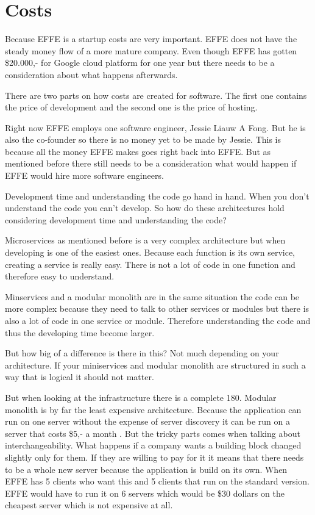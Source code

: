 \section{Costs}
\label{sec:Costs}

Because EFFE is a startup costs are very important. EFFE does not have the steady money flow of a more mature company. Even though EFFE has gotten \$20.000,- for Google cloud platform for one year but there needs to be a consideration about what happens afterwards.

There are two parts on how costs are created for software. The first one contains the price of development and the second one is the price of hosting.

Right now EFFE employs one software engineer, Jessie Liauw A Fong. But he is also the co-founder so there is no money yet to be made by Jessie. This is because all the money EFFE makes goes right back into EFFE. But as mentioned before there still needs to be a consideration what would happen if EFFE would hire more software engineers.

Development time and understanding the code go hand in hand. When you don’t understand the code you can’t develop. So how do these architectures hold considering development time and understanding the code?

Microservices as mentioned before is a very complex architecture but when developing is one of the easiest ones. Because each function is its own service, creating a service is really easy. There is not a lot of code in one function and therefore easy to understand.

Minservices and a modular monolith are in the same situation the code can be more complex because they need to talk to other services or modules but there is also a lot of code in one service or module. Therefore understanding the code and thus the developing time become larger.

But how big of a difference is there in this? Not much depending on your architecture. If your miniservices and modular monolith are structured in such a way that is logical it should not matter.

But when looking at the infrastructure there is a complete 180. Modular monolith is by far the least expensive architecture. Because the application can run on one server without the expense of server discovery it can be run on a server that costs \$5,- a month \cite{digitalOcean}. But the tricky parts comes when talking about interchangeability. What happens if a company wants a building block changed slightly only for them. If they are willing to pay for it it means that there needs to be a whole new server because the application is build on its own. When EFFE has 5 clients who want this and 5 clients that run on the standard version. EFFE would have to run it on 6 servers which would be \$30 dollars on the cheapest server which is not expensive at all.

